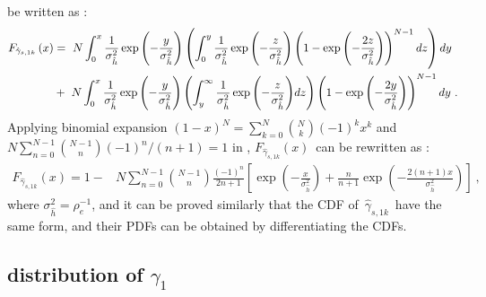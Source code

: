 \documentclass[onecolumn,letterpaper,11pt,draftclsnofoot]{IEEEtran}
\begin{document}
be written as :
\begin{align}
F_{\hat \gamma _{s,1k} } \left( x \right) &=~N\int_0^x
{\frac{1}{{\sigma _{\hat h}^2 }}\exp \left( { - \frac{y}{{\sigma
_{\hat h}^2 }}} \right)} \left( {\int_0^y {\frac{1}{{\sigma _{\hat
h}^2 }}\exp \left( { - \frac{z}{{\sigma _{\hat h}^2 }}} \right)}
\left( {1 - \exp \left( { - \frac{{2z}}{{\sigma _{\hat h}^2 }}}
\right)} \right)^{N - 1} dz} \right)dy
\\\notag
&+~N\int_0^x {\frac{1}{{\sigma _{\hat h}^2 }}\exp \left( { -
\frac{y}{{\sigma _{\hat h}^2 }}} \right)} \left( {\int_y^\infty
{\frac{1}{{\sigma _{\hat h}^2 }}\exp \left( { - \frac{z}{{\sigma
_{\hat h}^2 }}} \right)} dz} \right)\left( {1 - \exp \left( { -
\frac{{2y}}{{\sigma _{\hat h}^2 }}} \right)} \right)^{N - 1} dy~.
\end{align}
Applying binomial expansion $\left( {1 - x} \right)^N  =
\sum\nolimits_{k = 0}^N {\binom{N}{k}} \left( { - 1} \right)^k x^k$
 and $
N\sum\nolimits_{n = 0}^{N - 1} \binom{N-1}{n} {{\left( { - 1}
\right)^n }}/\left({{n + 1}}\right) = 1 $ in
\cite[(0.155.1)]{Gradshteyn94}, $F_{\hat \gamma _{s,1k} } \left( x
\right)$~can be rewritten as :
\begin{align}\label{Eq:Fs1k}
F_{\hat \gamma _{s,1k} } \left( x \right) = 1 - &N\sum\limits_{n =
0}^{N - 1} \binom{N-1}{n} \frac{{\left( { - 1} \right)^n }}{{2n +
1}}\left[\exp \left( { - \frac{x}{{\sigma _{\hat h}^2 }}} \right) +
\frac{n}{{n + 1}}\exp \left( { - \frac{{2\left( {n + 1}
\right)x}}{{\sigma _{\hat h}^2 }}} \right)\right]~,
\end{align}
where $\sigma_{\hat h}^2=\rho_e^{-1}$, and it can be proved
similarly that the CDF of~$\hat \gamma_{s,1k}$~have the same form,
and their PDFs can be obtained by differentiating the CDFs.

\subsection{distribution of $\gamma_1$}
\end{document}
